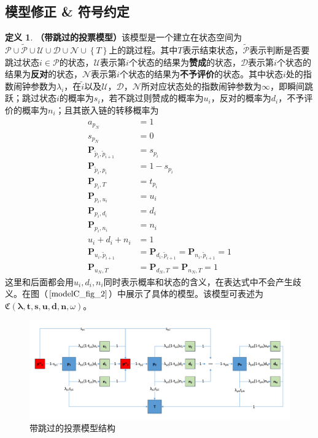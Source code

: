 \documentclass[UTF8]{ctexart}
\theoremstyle{plain}
\theoremstyle{definition}
\newtheorem{defn}{定义}[section]
\theoremstyle{remark}
\begin{document}
	\subsection{模型修正 \& 符号约定}
	\begin{defn}\textbf{（带跳过的投票模型）}该模型是一个建立在状态空间为$\mathcal{P} \cup \mathcal{\tilde{P}} \cup \mathcal{U} \cup \mathcal{D} \cup \mathcal{N} \cup \left\{T\right\}$上的跳过程。其中$T$表示结束状态，$\mathcal{\tilde{P}}$表示判断是否要跳过状态$i \in \mathcal{P}$的状态，$\mathcal{U}$表示第$i$个状态的结果为\textbf{赞成}的状态，$\mathcal{D}$表示第$i$个状态的结果为\textbf{反对}的状态，$\mathcal{N}$表示第$i$个状态的结果为\textbf{不予评价}的状态。其中状态$i$处的指数闹钟参数为$\lambda_i$，在$\tilde{i}$以及$\mathcal{U}$，$\mathcal{D}$，$\mathcal{N}$所对应状态处的指数闹钟参数为$\infty$，即瞬间跳跃；跳过状态$i$的概率为$s_i$，若不跳过则赞成的概率为$u_i$，反对的概率为$d_i$，不予评价的概率为$n_i$；且其嵌入链的转移概率为
	\begin{equation}
	\begin{aligned}
	a_{p_N} & = 1 \\
	s_{p_N} & = 0 \\
	\bm{P}_{\tilde{p}_i, \tilde{p}_{i+1}} & = s_{p_i} \\
	\bm{P}_{\tilde{p}_i, p_i} & = 1 - s_{p_i} \\
	\bm{P}_{p_i,T}  & = t_{p_i} \\
	\bm{P}_{p_i,u_i} & = u_i \\
	\bm{P}_{p_i,d_i} & = d_i \\
	\bm{P}_{p_i,n_i} & = n_i \\
	u_i + d_i + n_i & = 1\\
	\bm{P}_{u_i, \tilde{p}_{i+1}} & = \bm{P}_{d_i, \tilde{p}_{i+1}} = \bm{P}_{n_i, \tilde{p}_{i+1}} = 1 \\
	\bm{P}_{u_N, T} & = \bm{P}_{d_N, T} = \bm{P}_{n_N, T} = 1
	\end{aligned}
	\end{equation}
	这里和后面都会用$u_i,d_i,n_i$同时表示概率和状态的含义，在表达式中不会产生歧义。在图（$\ref{modelC_fig_2}$）中展示了具体的模型。该模型可表述为$\mathfrak{C}\left(\bm{\lambda}, \bm{t}, \bm{s}, \bm{u}, \bm{d}, \bm{n},\omega\right)$。
	\end{defn}
	\begin{figure}[h!] 
		\centering
		\includegraphics[width = 12cm]{modelC_fig_2.pdf}
		\caption{带跳过的投票模型结构}\label{modelC_fig_2}
	\end{figure}
	
\end{document}
